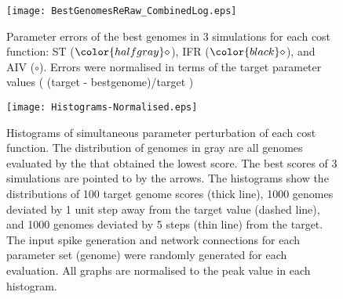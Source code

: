 \clearpage

\begin{figure}[tb!]
  \centering
  \texttt{[image: BestGenomesReRaw\_CombinedLog.eps]}
  \caption{Parameter errors of the best genomes in 3 {\GA}
    simulations for each cost function: ST (${\color{halfgray} \diamond }$), IFR (${\color{black} \diamond }$), and AIV (${\circ}$). Errors were normalised in terms
    of the target parameter values ( (target - bestgenome)/target )}\label{fig:R2b}
\end{figure}






\newpage


\begin{figure}[tb!]
  \centering
  \texttt{[image: Histograms-Normalised.eps]}  
  \caption{Histograms of simultaneous parameter perturbation of each cost
    function. The distribution of genomes in gray are all genomes evaluated by
    the {\GA} that obtained the lowest score. The best scores of 3 {\GA} simulations
    are pointed to by the arrows. The histograms show the distributions of 100
    target genome scores (thick line), 1000 genomes deviated by 1 unit step away
    from the target value (dashed line), and 1000 genomes deviated by 5 steps
    (thin line) from the target. The input spike generation and network
    connections for each parameter set (genome) were randomly generated for each
    evaluation.  All graphs are normalised to the peak value in each
    histogram.\label{fig:R3}}
\end{figure}

